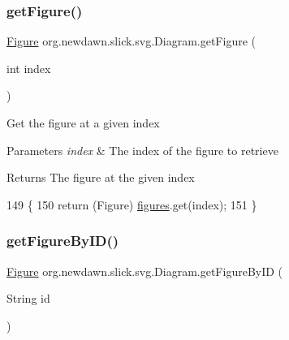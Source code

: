 \subsubsection{\texorpdfstring{get\+Figure()}{getFigure()}}
{\footnotesize\ttfamily \mbox{\hyperlink{classorg_1_1newdawn_1_1slick_1_1svg_1_1_figure}{Figure}} org.\+newdawn.\+slick.\+svg.\+Diagram.\+get\+Figure (\begin{DoxyParamCaption}\item[{int}]{index }\end{DoxyParamCaption})\hspace{0.3cm}{\ttfamily [inline]}}

Get the figure at a given index


\begin{DoxyParams}{Parameters}
{\em index} & The index of the figure to retrieve \\
\hline
\end{DoxyParams}
\begin{DoxyReturn}{Returns}
The figure at the given index 
\end{DoxyReturn}

\begin{DoxyCode}
149                                        \{
150         \textcolor{keywordflow}{return} (Figure) \mbox{\hyperlink{classorg_1_1newdawn_1_1slick_1_1svg_1_1_diagram_aaddbe68bc0b0c847583aa35d530aba2f}{figures}}.get(index);
151     \}
\end{DoxyCode}
\mbox{\label{classorg_1_1newdawn_1_1slick_1_1svg_1_1_diagram_a48e5139af7e00cb48fcffcc5dea19106}} 
\subsubsection{\texorpdfstring{get\+Figure\+By\+I\+D()}{getFigureByID()}}
{\footnotesize\ttfamily \mbox{\hyperlink{classorg_1_1newdawn_1_1slick_1_1svg_1_1_figure}{Figure}} org.\+newdawn.\+slick.\+svg.\+Diagram.\+get\+Figure\+By\+ID (\begin{DoxyParamCaption}\item[{String}]{id }\end{DoxyParamCaption})\hspace{0.3cm}{\ttfamily [inline]}}

